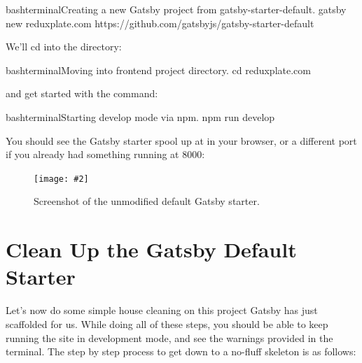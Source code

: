 \documentclass[a4paper,headinclude=on,footinclude=on,12pt,oneside]{scrbook}
\newcommand{\standardfigure}[3]{\begin{figure}[H]\begin{center}\texttt{[image: \#2]}\caption{#3}\label{fig:#2}\end{center}\end{figure}}
\begin{document}
\begin{codeInput}{bash}{terminal}{Creating a new Gatsby project from gatsby-starter-default.}
gatsby new reduxplate.com https://github.com/gatsbyjs/gatsby-starter-default
\end{codeInput}

We'll cd into the directory:

\begin{codeInput}{bash}{terminal}{Moving into frontend project directory.}
cd reduxplate.com
\end{codeInput}

and get started with the  command:

\begin{codeInput}{bash}{terminal}{Starting develop mode via npm.}
npm run develop
\end{codeInput}

You should see the Gatsby starter spool up at  in your browser, or a different port if you already had something running at 8000:

\standardfigure{\textwidth/2}{frontend/gatsby-starter}{Screenshot of the unmodified default Gatsby starter.}

\section{Clean Up the Gatsby Default Starter}

Let's now do some simple house cleaning on this project Gatsby has just scaffolded for us. While doing all of these steps, you should be able to keep running the site in development mode, and see the warnings provided in the terminal. The step by step process to get down to a no-fluff skeleton is as follows:
\end{document}
